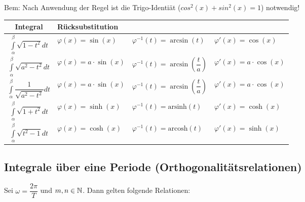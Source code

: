 \begin{multicols*}{2}
    Bem: Nach Anwendung der Regel ist die Trigo-Identiät ($cos^2(x) + sin^2(x) = 1$) notwendig!

    \begin{center}
        \renewcommand{\arraystretch}{2}
        \begin{tabular}{c l l l} \toprule
            \textbf{Integral}                                             & \multicolumn{2}{l}{\textbf{Rücksubstitution}}                                                                                          \\
            \midrule 
            $\int\limits_{\alpha}^{\beta} \sqrt{1 - t^2} dt$              & $\varphi(x) = \sin(x)$                        & $\varphi^{-1}(t) = \arcsin(t)$                       & $\varphi'(x) = \cos(x)$         \\
            \midrule
            $\int\limits_{\alpha}^{\beta} \sqrt{a^2 - t^2} dt$            & $\varphi(x) = a \cdot \sin(x)$                & $\varphi^{-1}(t) = \arcsin\left(\dfrac{t}{a}\right)$ & $\varphi'(x) = a \cdot \cos(x)$ \\
            $\int\limits_{\alpha}^{\beta} \dfrac{1}{\sqrt{a^2 - t^2}} dt$ & $\varphi(x) = a \cdot \sin(x)$                & $\varphi^{-1}(t) = \arcsin\left(\dfrac{t}{a}\right)$ & $\varphi'(x) = a \cdot \cos(x)$ \\
            \midrule
            $\int\limits_{\alpha}^{\beta} \sqrt{1 + t^2} dt$              & $\varphi(x) = \sinh(x)$                       & $\varphi^{-1}(t) = \text{arsinh}(t)$                 & $\varphi'(x) = \cosh(x)$        \\
            $\int\limits_{\alpha}^{\beta} \sqrt{t^2 - 1} dt$              & $\varphi(x) = \cosh(x)$                       & $\varphi^{-1}(t) = \text{arcosh}(t)$                 & $\varphi'(x) = \sinh(x)$        \\
            \bottomrule
        \end{tabular}
    \end{center}


    \subsection{Integrale über eine Periode (Orthogonalitätsrelationen)}

    Sei $\omega = \dfrac{2\pi}{T}$ und $m,n \in \mathbb{N}$. Dann gelten folgende Relationen:


\end{multicols*}
